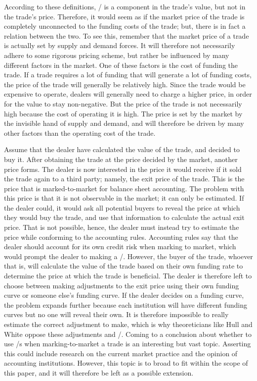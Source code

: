 \documentclass[main.tex]{subfiles}
\begin{document}
    According to these definitions, 
    \FVA/ is a component in the trade's value, but not in the trade's price. 
    Therefore, it would seem as if the market price of the trade 
    is completely unconnected to the funding costs of the trade;
    but, there is in fact a relation between the two. 
    To see this, remember that the market price of a trade 
    is actually set by supply and demand forces.
    It will therefore not necessarily adhere to some rigorous pricing scheme,
    but rather be influenced by many different factors in the market.
    One of these factors is the cost of funding the trade.
    If a trade requires a lot of funding that will generate a lot of funding costs,
    the price of the trade will generally be relatively high.
    Since the trade would be expensive to operate, 
    dealers will generally need to charge a higher price, 
    in order for the value to stay non-negative.
    But the price of the trade is not necessarily high because the cost of operating it is high.
    The price is set by the market by the invisible hand of supply and demand,
    and will therefore be driven by many other factors than the operating cost of the trade.

    Assume that the dealer have calculated the value of the trade, and decided to buy it.
    After obtaining the trade at the price decided by the market, another price forms. 
    The dealer is now interested in the price it would receive 
    if it sold the trade again to a third party; namely, the exit price of the trade.
    This is the price that is marked-to-market for balance sheet accounting.
    The problem with this price is that it is not observable in the market; it can only be estimated.
    If the dealer could, it would ask all potential buyers to reveal the price 
    at which they would buy the trade, and use that information to calculate the actual exit price.
    That is not possible, hence, the dealer must instead try to estimate the price
    while conforming to the accounting rules.
    Accounting rules say that the dealer should account for its own credit risk 
    when marking to market, which would prompt the dealer to making a \DVA/.
    However, the buyer of the trade, whoever that is, will calculate the value of the trade
    based on their own funding rate to determine the price at which the trade is beneficial.
    The dealer is therefore left to choose between making adjustments to the exit price
    using their own funding curve or someone else's funding curve.
    If the dealer decides on a funding curve, the problem expands further
    because each institution will have different funding curves but no one will reveal their own.
    It is therefore impossible to really estimate the correct adjustment to make,
    which is why theoreticians like Hull and White oppose these adjustments and \FVA/.
    Coming to a conclusion about whether to use \FVA/s when marking-to-market a trade
    is an interesting but vast topic.
    Asserting this could include research on the current market practice and
    the opinion of accounting institutions.
    However, this topic is to broad to fit within the scope of this paper,
    and it will therefore be left as a possible extension.
\end{document}
